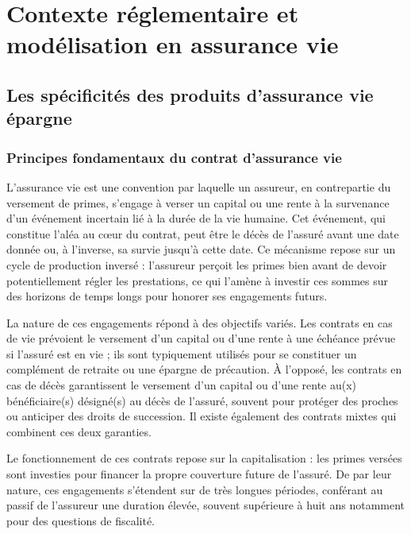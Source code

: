 \chapter{Contexte réglementaire et modélisation en assurance vie}
\label{chap:contexte}
\newpage
\section{Les spécificités des produits d'assurance vie épargne}
\label{sec:spec_av}

\subsection{Principes fondamentaux du contrat d'assurance vie}

L'assurance vie est une convention par laquelle un assureur, en contrepartie du versement de primes, s'engage à verser un capital ou une rente à la survenance d'un événement incertain lié à la durée de la vie humaine. Cet événement, qui constitue l'aléa au cœur du contrat, peut être le décès de l'assuré avant une date donnée ou, à l'inverse, sa survie jusqu'à cette date. Ce mécanisme repose sur un cycle de production inversé : l'assureur perçoit les primes bien avant de devoir potentiellement régler les prestations, ce qui l'amène à investir ces sommes sur des horizons de temps longs pour honorer ses engagements futurs.

\bigskip

La nature de ces engagements répond à des objectifs variés. Les contrats en cas de vie prévoient le versement d'un capital ou d'une rente à une échéance prévue si l'assuré est en vie ; ils sont typiquement utilisés pour se constituer un complément de retraite ou une épargne de précaution. À l'opposé, les contrats en cas de décès garantissent le versement d'un capital ou d'une rente au(x) bénéficiaire(s) désigné(s) au décès de l'assuré, souvent pour protéger des proches ou anticiper des droits de succession. Il existe également des contrats mixtes qui combinent ces deux garanties.

\bigskip

Le fonctionnement de ces contrats repose sur la capitalisation : les primes versées sont investies pour financer la propre couverture future de l'assuré. De par leur nature, ces engagements s'étendent sur de très longues périodes, conférant au passif de l'assureur une duration élevée, souvent supérieure à huit ans notamment pour des questions de fiscalité.

